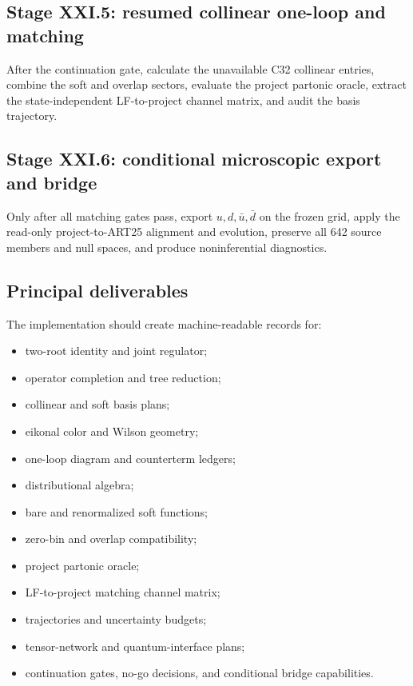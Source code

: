 \documentclass[11pt]{article}
\begin{document}
\subsection{Stage XXI.5: resumed collinear one-loop and matching}

After the continuation gate, calculate the unavailable C32 collinear entries, combine the soft and overlap sectors, evaluate the project partonic oracle, extract the state-independent LF-to-project channel matrix, and audit the basis trajectory.

\subsection{Stage XXI.6: conditional microscopic export and bridge}

Only after all matching gates pass, export \(u,d,\bar u,\bar d\) on the frozen grid, apply the read-only project-to-ART25 alignment and evolution, preserve all 642 source members and null spaces, and produce noninferential diagnostics.

\subsection{Principal deliverables}

The implementation should create machine-readable records for:
\begin{itemize}
\item two-root identity and joint regulator;
\item operator completion and tree reduction;
\item collinear and soft basis plans;
\item eikonal color and Wilson geometry;
\item one-loop diagram and counterterm ledgers;
\item distributional algebra;
\item bare and renormalized soft functions;
\item zero-bin and overlap compatibility;
\item project partonic oracle;
\item LF-to-project matching channel matrix;
\item trajectories and uncertainty budgets;
\item tensor-network and quantum-interface plans;
\item continuation gates, no-go decisions, and conditional bridge capabilities.
\end{itemize}
\end{document}
